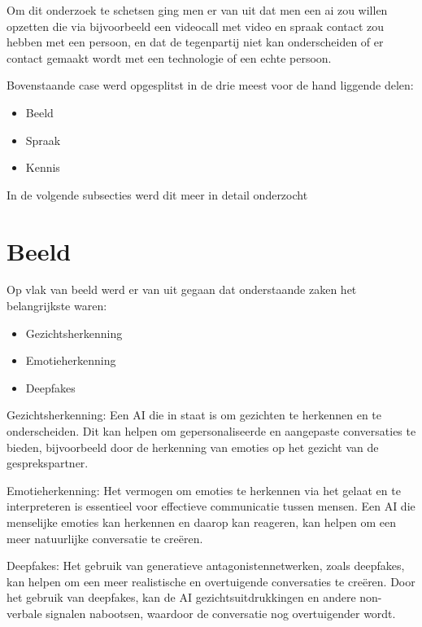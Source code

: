 Om dit onderzoek te schetsen ging men er van uit dat men een ai zou willen opzetten die via bijvoorbeeld een videocall met video en spraak contact zou hebben met een persoon, en dat de tegenpartij niet kan onderscheiden of er contact gemaakt wordt met een technologie of een echte persoon.

Bovenstaande case werd opgesplitst in de drie meest voor de hand liggende delen:

\begin{itemize}
    \item Beeld
    \item Spraak
    \item Kennis
\end{itemize}

In de volgende subsecties werd dit meer in detail onderzocht

\newpage

\section{Beeld}

Op vlak van beeld werd er van uit gegaan dat onderstaande zaken het belangrijkste waren:

\begin{itemize}
    \item Gezichtsherkenning
    \item Emotieherkenning
    \item Deepfakes
\end{itemize}

Gezichtsherkenning: Een AI die in staat is om gezichten te herkennen en te onderscheiden. Dit kan helpen om gepersonaliseerde en aangepaste conversaties te bieden, bijvoorbeeld door de herkenning van emoties op het gezicht van de gesprekspartner.

Emotieherkenning: Het vermogen om emoties te herkennen via het gelaat en te interpreteren is essentieel voor effectieve communicatie tussen mensen. Een AI die menselijke emoties kan herkennen en daarop kan reageren, kan helpen om een meer natuurlijke conversatie te creëren.

Deepfakes: Het gebruik van generatieve antagonistennetwerken, zoals deepfakes, kan helpen om een meer realistische en overtuigende conversaties te creëren. Door het gebruik van deepfakes, kan de AI gezichtsuitdrukkingen en andere non-verbale signalen nabootsen, waardoor de conversatie nog overtuigender wordt.

\newpage

